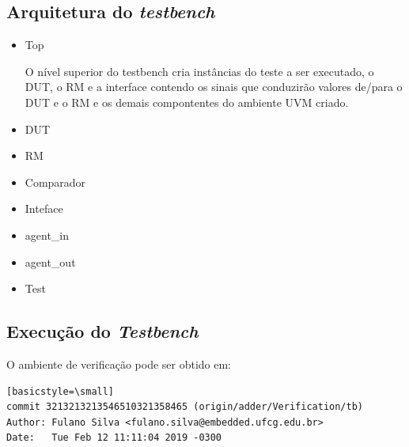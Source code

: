 \documentclass[a4paper]{article}
\begin{document}
{\subsection{Arquitetura do \textit{testbench}}

\begin{itemize}
    \item Top
    
        O nível superior do testbench cria instâncias do teste a ser executado, o DUT, o RM e a interface contendo os sinais que conduzirão valores de/para o DUT e o RM e os demais compontentes do ambiente UVM criado.
        
    \item DUT
    
        
        
        \newpage
        
    \item RM
    
        
        
    \item Comparador
    
        
        
    \item Inteface
    
        
    
    \item agent\_in
        
        
        
    \item agent\_out
        
        
    
    \item Test
        
        
    
\end{itemize}

\subsection{Execução do \textit{Testbench}}

O ambiente de verificação pode ser obtido em:

\vspace{5pt}

\lstset{language=bash}
\begin{lstlisting}[backgroundcolor=\color{grey}][basicstyle=\small]
commit 3213213213546510321358465 (origin/adder/Verification/tb)
Author: Fulano Silva <fulano.silva@embedded.ufcg.edu.br>
Date:   Tue Feb 12 11:11:04 2019 -0300


\end{lstlisting}}
\end{document}
